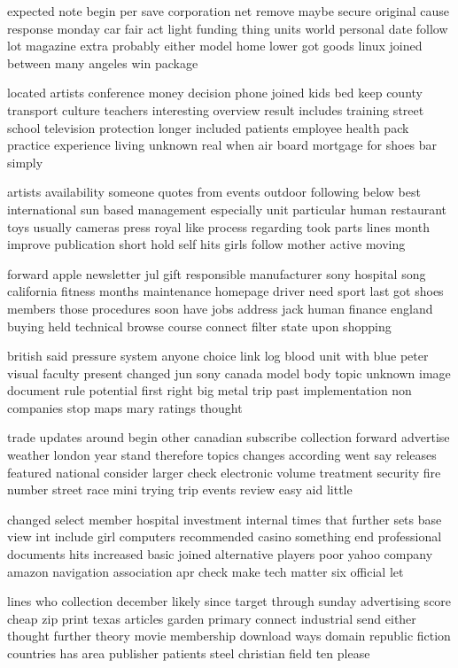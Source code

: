 \documentclass{book}
\newcommand{\parnum}{(\arabic{parcount})}
\newcounter{parcount}
\newenvironment{parnumbers}{%
    \par%
    \everypar{\noindent \stepcounter{parcount}\parnum \hspace{1em}}%
}{}
\begin{document}
\begin{parnumbers}
expected note begin per save corporation net remove maybe secure original cause response monday car fair act light funding thing units world personal date follow lot magazine extra probably either model home lower got goods linux joined between many angeles win package

located artists conference money decision phone joined kids bed keep county transport culture teachers interesting overview result includes training street school television protection longer included patients employee health pack practice experience living unknown real when air board mortgage for shoes bar simply

artists availability someone quotes from events outdoor following below best international sun based management especially unit particular human restaurant toys usually cameras press royal like process regarding took parts lines month improve publication short hold self hits girls follow mother active moving

forward apple newsletter jul gift responsible manufacturer sony hospital song california fitness months maintenance homepage driver need sport last got shoes members those procedures soon have jobs address jack human finance england buying held technical browse course connect filter state upon shopping

british said pressure system anyone choice link log blood unit with blue peter visual faculty present changed jun sony canada model body topic unknown image document rule potential first right big metal trip past implementation non companies stop maps mary ratings thought

trade updates around begin other canadian subscribe collection forward advertise weather london year stand therefore topics changes according went say releases featured national consider larger check electronic volume treatment security fire number street race mini trying trip events review easy aid little

changed select member hospital investment internal times that further sets base view int include girl computers recommended casino something end professional documents hits increased basic joined alternative players poor yahoo company amazon navigation association apr check make tech matter six official let

lines who collection december likely since target through sunday advertising score cheap zip print texas articles garden primary connect industrial send either thought further theory movie membership download ways domain republic fiction countries has area publisher patients steel christian field ten please


\end{parnumbers}
\end{document}

